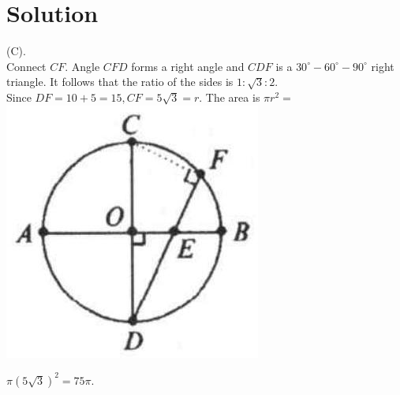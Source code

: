 \documentclass{article}
\begin{document}
\section*{Solution}
(C).\\
Connect \(C F\). Angle \(C F D\) forms a right angle and \(C D F\) is a \(30^{\circ}-60^{\circ}-90^{\circ}\) right triangle. It follows that the ratio of the sides is \(1: \sqrt{3}: 2\).\\
Since \(D F=10+5=15, C F=5 \sqrt{3}=r\). The area is \(\pi r^{2}=\)\\
\centering
\includegraphics[width=\textwidth]{images/reasoning_image_1.jpg}


\(\pi(5 \sqrt{3})^{2}=75 \pi\).
\end{document}
